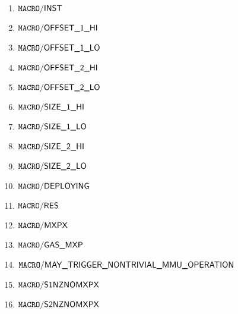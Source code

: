 \begin{enumerate}
	\item $\mxpMacroInst$
    \item $\mxpMacroOffsetOneHi$
    \item $\mxpMacroOffsetOneLo$
    \item $\mxpMacroOffsetTwoHi$
    \item $\mxpMacroOffsetTwoLo$
    \item $\mxpMacroSizeOneHi$
    \item $\mxpMacroSizeOneLo$
    \item $\mxpMacroSizeTwoHi$
    \item $\mxpMacroSizeTwoLo$
    \item $\mxpMacroDeploying$
    \item $\mxpMacroRes$
    \item $\mxpMacroMxpx$
    \item $\mxpMacroGasMxp$
    \item $\mxpMacroMayTriggerNontrivialMmuOperation$
    \item $\mxpMacroSOneNzNoMxpx$
    \item $\mxpMacroSTwoNzNoMxpx$
\end{enumerate}